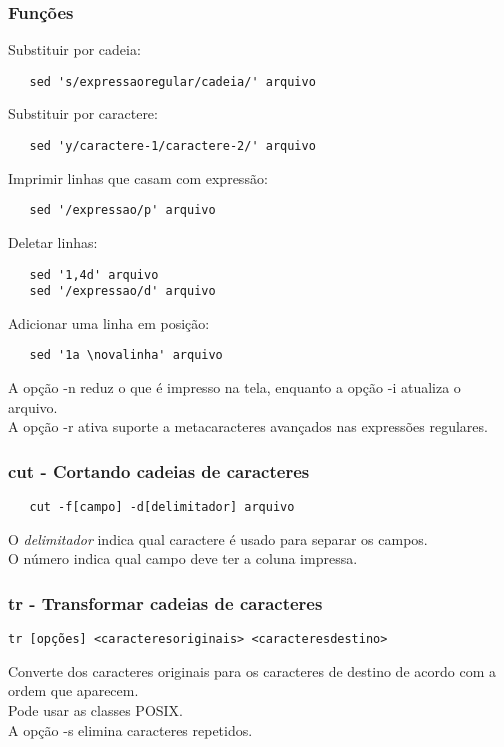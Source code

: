 \documentclass{beamer}
\begin{document}
\begin{frame}[fragile]
   \frametitle{Funções}
   \scriptsize
   Substituir por cadeia:
   \begin{verbatim}
   sed 's/expressaoregular/cadeia/' arquivo
   \end{verbatim}
   Substituir por caractere:
   \begin{verbatim}
   sed 'y/caractere-1/caractere-2/' arquivo 
   \end{verbatim}
   Imprimir linhas que casam com expressão:
   \begin{verbatim}
   sed '/expressao/p' arquivo 
   \end{verbatim}
   Deletar linhas:
   \begin{verbatim}
   sed '1,4d' arquivo 
   sed '/expressao/d' arquivo 
   \end{verbatim}
   Adicionar uma linha em posição:
   \begin{verbatim}
   sed '1a \novalinha' arquivo 
   \end{verbatim}
   A opção -n reduz o que é impresso na tela, enquanto a opção -i atualiza o arquivo. \\
   A opção -r ativa suporte a metacaracteres avançados nas expressões regulares. \\
\end{frame}

\begin{frame}[fragile]
   \frametitle{cut - Cortando cadeias de caracteres}
   \begin{verbatim}
   cut -f[campo] -d[delimitador] arquivo 
   \end{verbatim}
   O \textit{delimitador} indica qual caractere é usado para separar os campos. \\
   O número  indica qual campo deve ter a coluna impressa. \\
\end{frame}

\begin{frame}[fragile]
   \frametitle{tr - Transformar cadeias de caracteres}
   \begin{verbatim}
tr [opções] <caracteresoriginais> <caracteresdestino>
   \end{verbatim}
   Converte dos caracteres originais para os caracteres de destino de acordo com a ordem que aparecem. \\
   Pode usar as classes POSIX. \\
   A opção -s elimina caracteres repetidos. \\
\end{frame}
\end{document}
